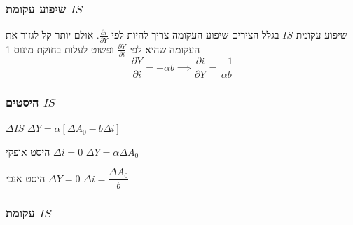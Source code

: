 \documentclass[usenames,dvipsnames]{beamer}
\newcommand{\D}[1]{\Delta #1}
\renewcommand{\a}{\alpha}
\begin{document}
\begin{RTL}
\begin{frame}
        
        \end{frame}


        \begin{frame}
            \frametitle{שיפוע עקומת $IS$}
            \begin{block}{שיפוע עקומת $IS$}
                בגלל הצירים שיפוע העקומה צריך להיות לפי $\frac{\partial i}{\partial Y}$.
אולם יותר קל לגזור את העקומה שהיא לפי $\frac{\partial Y}{\partial i}$ ופשוט לעלות בחזקת מינוס 1
\begin{equation*}
    \frac{\partial Y}{\partial i} = - \alpha b \implies \frac{\partial i}{\partial Y } = \frac{-1}{\alpha b}
 \end{equation*}
            \end{block}
            
        
        \end{frame}

        \begin{frame}
            \frametitle{היסטים $IS$}
            \begin{alertblock}{$\D{IS}$}
                $\Delta Y = \alpha \left[\Delta A_0 - b\Delta i\right]$  
            \end{alertblock}
            
            \begin{block}{ היסט אופקי $\Delta i = 0 $}
                $\D{Y} = \a \D{A_0}$
            \end{block}

            \begin{block}{ היסט אנכי $\Delta Y = 0 $}
                $\D{i} = \dfrac{\D{A_0}}{b}$
            \end{block}

            
        
        \end{frame}
        \end{RTL}
        \begin{frame}
            \frametitle{עקומת $IS$}
            \begin{flushleft}
            \end{flushleft}
        
            
        
        \end{frame}
\end{document}
